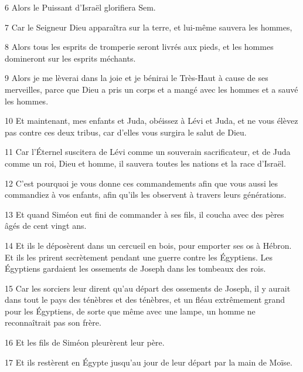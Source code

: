 \par 6 Alors le Puissant d'Israël glorifiera Sem.

\par 7 Car le Seigneur Dieu apparaîtra sur la terre, et lui-même sauvera les hommes,

\par 8 Alors tous les esprits de tromperie seront livrés aux pieds, et les hommes domineront sur les esprits méchants.

\par 9 Alors je me lèverai dans la joie et je bénirai le Très-Haut à cause de ses merveilles, parce que Dieu a pris un corps et a mangé avec les hommes et a sauvé les hommes.

\par 10 Et maintenant, mes enfants et Juda, obéissez à Lévi et Juda, et ne vous élèvez pas contre ces deux tribus, car d'elles vous surgira le salut de Dieu.

\par 11 Car l'Éternel suscitera de Lévi comme un souverain sacrificateur, et de Juda comme un roi, Dieu et homme, il sauvera toutes les nations et la race d'Israël.

\par 12 C'est pourquoi je vous donne ces commandements afin que vous aussi les commandiez à vos enfants, afin qu'ils les observent à travers leurs générations.

\par 13 Et quand Siméon eut fini de commander à ses fils, il coucha avec des pères âgés de cent vingt ans.

\par 14 Et ils le déposèrent dans un cercueil en bois, pour emporter ses os à Hébron. Et ils les prirent secrètement pendant une guerre contre les Égyptiens. Les Égyptiens gardaient les ossements de Joseph dans les tombeaux des rois.

\par 15 Car les sorciers leur dirent qu'au départ des ossements de Joseph, il y aurait dans tout le pays des ténèbres et des ténèbres, et un fléau extrêmement grand pour les Égyptiens, de sorte que même avec une lampe, un homme ne reconnaîtrait pas son frère.

\par 16 Et les fils de Siméon pleurèrent leur père.

\par 17 Et ils restèrent en Égypte jusqu'au jour de leur départ par la main de Moïse.


